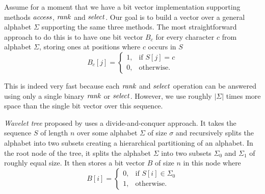 Assume for a moment that we have a bit vector implementation supporting methods $\mathit{access}$,
$\mathit{rank}$ and $\mathit{select}$. Our goal is to build a vector over a general alphabet $\Sigma$
supporting the same three methods. The most straightforward approach to do this is to
have one bit vector $B_c$ for every character $c$ from alphabet $\Sigma$, storing ones at
positions where $c$ occurs in $S$
\[
    B_c[j]= 
\begin{cases}
	1,& \text{if } S[j]=c \\
    0,& \text{otherwise.}
\end{cases}
\]

This is indeed very fast because each $\mathit{rank}$ and $\mathit{select}$ operation can be answered using
only a single binary $\mathit{rank}$ or $\mathit{select}$. However, we use roughly $|\Sigma|$ times more space
than the single bit vector over this sequence.

\textit{Wavelet tree} proposed by \cite{grossi2003high} uses a divide-and-conquer
approach. It takes the sequence $S$ of length $n$ over some alphabet $\Sigma$ of size
$\sigma$ and recursively splits the alphabet into two subsets creating a hierarchical
partitioning of an alphabet. In the root node of the tree, it splits the alphabet
$\Sigma$ into two subsets $\Sigma_0$ and $\Sigma_1$ of roughly equal size. It then
stores a bit vector $B$ of size $n$ in this node where
\[
    B[i]= 
\begin{cases}
    0,& \text{if } S[i]\in \Sigma_0\\
    1,              & \text{otherwise.}
\end{cases}
\]

